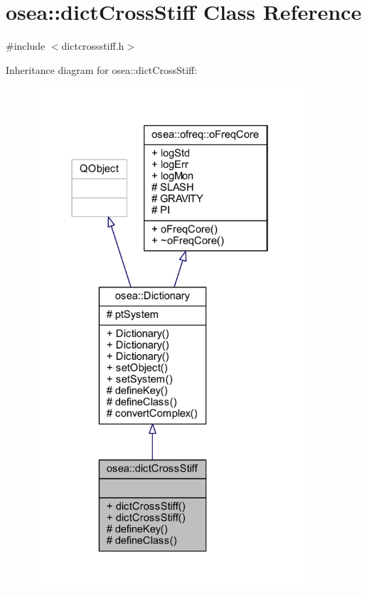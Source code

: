 \hypertarget{classosea_1_1dict_cross_stiff}{\section{osea\-:\-:dict\-Cross\-Stiff Class Reference}
\label{classosea_1_1dict_cross_stiff}
}


{\ttfamily \#include $<$dictcrossstiff.\-h$>$}



Inheritance diagram for osea\-:\-:dict\-Cross\-Stiff\-:
\nopagebreak
\begin{figure}[H]
\begin{center}
\leavevmode
\includegraphics[width=286pt]{classosea_1_1dict_cross_stiff__inherit__graph}
\end{center}
\end{figure}
